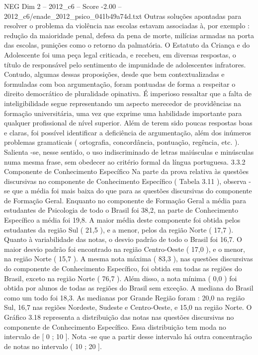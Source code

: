 \begin{textsample}{NEG Dim 2 – 2012\_c6 – Score -2.00 – 2012\_c6/enade\_2012\_psico\_041b49a74d.txt}
Outras soluções apontadas para resolver o problema da violência nas escolas estavam associadas à, por exemplo : redução da maioridade penal, defesa da pena de morte, milícias armadas na porta das escolas, punições como o retorno da palmatória.
O Estatuto da Criança e do Adolescente foi uma peça legal criticada, e recebeu, em diversas respostas, o título de responsável pelo sentimento de impunidade de adolescentes infratores.
Contudo, algumas dessas proposições, desde que bem contextualizadas e formuladas com boa argumentação, foram pontuadas de forma a respeitar o direito democrático de pluralidade opinativa.
É imperioso ressaltar que a falta de inteligibilidade segue representando um aspecto merecedor de providências na formação universitária, uma vez que exprime uma habilidade importante para qualquer profissional de nível superior.
Além de terem sido poucas respostas boas e claras, foi possível identificar a deficiência de argumentação, além dos inúmeros problemas gramaticais ( ortografia, concordância, pontuação, regência, etc. ).
Salienta -se, nesse sentido, o uso indiscriminado de letras maiúsculas e minúsculas numa mesma frase, sem obedecer ao critério formal da língua portuguesa. 3.3.2 Componente de Conhecimento Específico Na parte da prova relativa às questões discursivas no componente de Conhecimento Específico ( Tabela 3.11 ), observa -se que a média foi mais baixa do que para as questões discursivas do componente de Formação Geral.
Enquanto no componente de Formação Geral a média para estudantes de Psicologia de todo o Brasil foi 38,2, na parte de Conhecimento Específico a média foi 19,8.
A maior média deste componente foi obtida pelos estudantes da região Sul ( 21,5 ), e a menor, pelos da região Norte ( 17,7 ).
Quanto à variabilidade das notas, o desvio padrão de todo o Brasil foi 16,7.
O maior desvio padrão foi encontrado na região Centro-Oeste ( 17,0 ), e o menor, na região Norte ( 15,7 ).
A mesma nota máxima ( 83,3 ), nas questões discursivas do componente de Conhecimento Específico, foi obtida em todas as regiões do Brasil, exceto na região Norte ( 76,7 ).
Além disso, a nota mínima ( 0,0 ) foi obtida por alunos de todas as regiões do Brasil sem exceção.
A mediana do Brasil como um todo foi 18,3.
As medianas por Grande Região foram : 20,0 na região Sul, 16,7 nas regiões Nordeste, Sudeste e Centro-Oeste, e 15,0 na região Norte.
O Gráfico 3.18 representa a distribuição das notas nas questões discursivas no componente de Conhecimento Específico.
Essa distribuição tem moda no intervalo de [ 0 ; 10 ].
Nota -se que a partir desse intervalo há outra concentração de notas no intervalo ( 10 ; 20 ].

\end{textsample}
